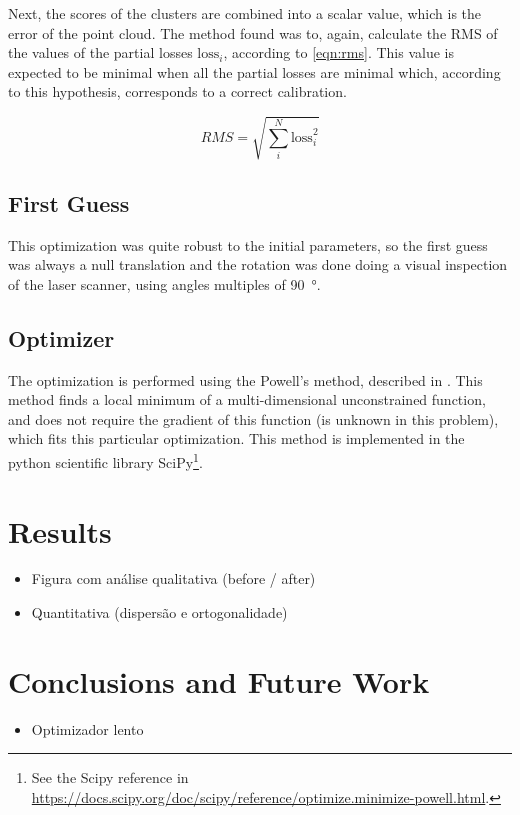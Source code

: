 \documentclass[conference]{IEEEtran}
\begin{document}
Next, the scores of the clusters are combined into a scalar value, which is the error of the point cloud. The method found was to, again, calculate the RMS of the values of the partial losses $\textrm{loss}_i$, according to \cref{eqn:rms}. This value is expected to be minimal when all the partial losses are minimal which, according to this hypothesis, corresponds to a correct calibration.

\begin{equation}
    \label{eqn:rms}
    RMS = \sqrt{\sum_{i}^{N}{\textrm{loss}_i^2}}
\end{equation}

\subsection{First Guess}

This optimization was quite robust to the initial parameters, so the first guess was always a null translation and the rotation was done doing a visual inspection of the laser scanner, using angles multiples of \SI{90}{\degree}.

\subsection{Optimizer}

The optimization is performed using the Powell's method, described in \cite{powell64}. This method finds a local minimum of a multi-dimensional unconstrained function, and does not require the gradient of this function (is unknown in this problem), which fits this particular optimization. This method is implemented in the python scientific library SciPy\footnote{See the Scipy reference in \url{https://docs.scipy.org/doc/scipy/reference/optimize.minimize-powell.html}.}.



\section{Results}\label{sec:results}

\begin{itemize}
    \item Figura com análise qualitativa (before / after)
    \item Quantitativa (dispersão e ortogonalidade)
\end{itemize}

\section{Conclusions and Future Work}\label{sec:conclusions}

\begin{itemize}
    \item Optimizador lento
\end{itemize}






\end{document}
